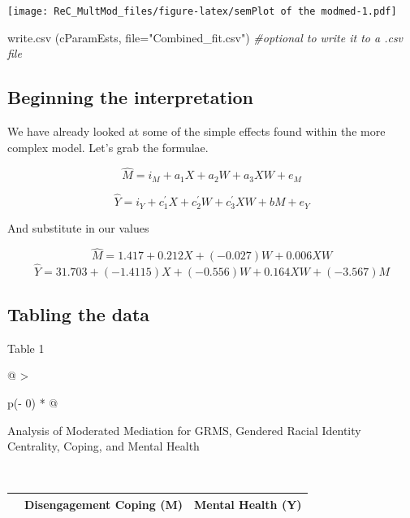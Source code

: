 \documentclass[
]{book}
\newenvironment{Shaded}{\begin{snugshade}}{\end{snugshade}}
\newcommand{\AttributeTok}[1]{\textcolor[rgb]{0.77,0.63,0.00}{#1}}
\newcommand{\CommentTok}[1]{\textcolor[rgb]{0.56,0.35,0.01}{\textit{#1}}}
\newcommand{\FunctionTok}[1]{\textcolor[rgb]{0.00,0.00,0.00}{#1}}
\newcommand{\NormalTok}[1]{#1}
\newcommand{\StringTok}[1]{\textcolor[rgb]{0.31,0.60,0.02}{#1}}
\begin{document}
\texttt{[image: ReC\_MultMod\_files/figure-latex/semPlot of the modmed-1.pdf]}

\begin{Shaded}
\begin{Highlighting}[]
\FunctionTok{write.csv}\NormalTok{ (cParamEsts, }\AttributeTok{file=}\StringTok{"Combined\_fit.csv"}\NormalTok{) }\CommentTok{\#optional to write it to a .csv file}
\end{Highlighting}
\end{Shaded}

\hypertarget{beginning-the-interpretation}{%
\subsection{Beginning the interpretation}\label{beginning-the-interpretation}}

We have already looked at some of the simple effects found within the more complex model. Let's grab the formulae.

\[\hat{M} = i_{M}+a_{1}X + a_{2}W + a_{3}XW + e_{M}\]

\[\hat{Y} = i_{Y}+c_{1}^{'}X+ c_{2}^{'}W+c_{3}^{'}XW+ bM+e_{Y}\]

And substitute in our values

\[\hat{M} = 1.417 + 0.212X + (-0.027) W + 0.006XW\]
\[\hat{Y} = 31.703 + (-1.4115)X + (-0.556)W + 0.164XW + (-3.567)M\]

\hypertarget{tabling-the-data-1}{%
\subsection{Tabling the data}\label{tabling-the-data-1}}

Table 1

\begin{longtable}[]{@{}
  >{\raggedright\arraybackslash}p{(\columnwidth - 0\tabcolsep) * }@{}}
\toprule
\begin{minipage}[b]{\linewidth}\raggedright
Analysis of Moderated Mediation for GRMS, Gendered Racial Identity Centrality, Coping, and Mental Health
\end{minipage} \\
\midrule
\endhead
\bottomrule
\end{longtable}

\begin{longtable}[]{@{}
  >{\raggedright\arraybackslash}p{}
  >{\centering\arraybackslash}p{}
  >{\centering\arraybackslash}p{}@{}}
\toprule
\endhead
& Disengagement Coping (M) & Mental Health (Y) \\
\bottomrule
\end{longtable}
\end{document}
